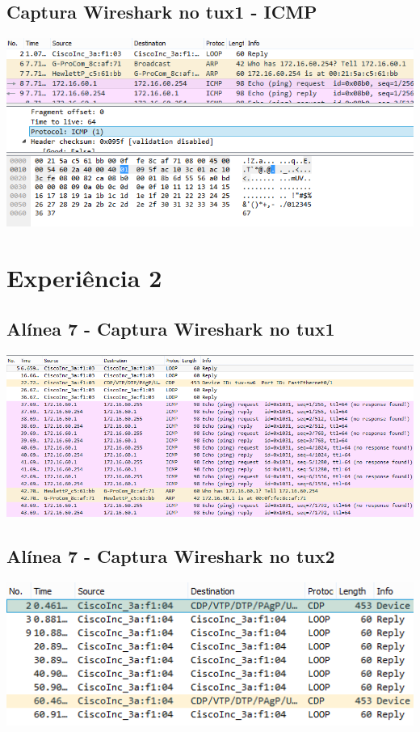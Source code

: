 \documentclass[11pt,a4paper,reqno]{report}
\numberwithin{equation}{section}
\begin{document}
\begin{appendices}
\subsection{Captura Wireshark no tux1 - ICMP}
\includegraphics[width=16cm]{ex1_icmp.png}

\section{Experiência 2}%
\label{ex_2}
\subsection{Alínea 7 - Captura Wireshark no tux1}
\includegraphics[width=16cm]{ex2_a7_tux1.png}
\subsection{Alínea 7 - Captura Wireshark no tux2}
\label{ex2_tux1ping_tux2}
\includegraphics[width=16cm]{ex2_a7_tux2.png}

\end{appendices}
\end{document}
